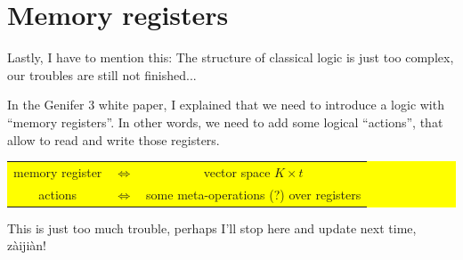 \documentclass[12pt]{article}
\begin{document}
\section{Memory registers}

Lastly, I have to mention this:  The structure of classical logic is just too complex, our troubles are still not finished... 

In the Genifer 3 white paper, I explained that we need to introduce a logic with ``memory registers''.  In other words, we need to add some logical ``actions'', that allow to read and write those registers.

\begin{center}
\colorbox{yellow}{\parbox{0.85\textwidth}{
\begin{tabular}{ccc}
memory register & $\Leftrightarrow$ & vector space $K \times t$ \\ 
actions & $\Leftrightarrow$ & some meta-operations (?) over registers\\
\end{tabular}
}}
\end{center}

This is just too much trouble, perhaps I'll stop here and update next time, z\`{a}iji\`{a}n!
\end{document}
